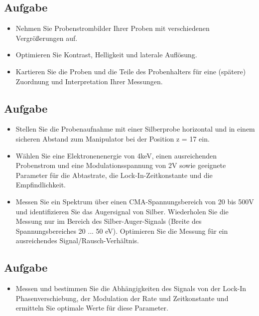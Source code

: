 \subsection{Aufgabe} %
\label{sub:aufgabe}
	
	\begin{itemize}
		 \item
		 	Nehmen Sie Probenstrombilder Ihrer Proben mit verschiedenen Vergrößerungen auf.
		 \item
		 	Optimieren Sie Kontrast, Helligkeit und laterale Auflösung.
		 \item
		 	Kartieren Sie die Proben und die Teile des Probenhalters für eine (spätere) Zuordnung und
		 	Interpretation Ihrer Messungen.
	\end{itemize}
	

\subsection{Aufgabe} %
\label{sub:aufgabe}

	\begin{itemize}
		\item
			Stellen Sie die Probenaufnahme mit einer Silberprobe horizontal und in einem sicheren Abstand zum Manipulator bei der Position z = 17 ein.
		\item
			Wählen Sie eine Elektronenenergie von 4keV, einen ausreichenden Probenstrom und eine Modulationsspannung von 2V sowie geeignete Parameter für die Abtastrate, die Lock-In-Zeitkonstante und die Empfindlichkeit.
		\item
			Messen Sie ein Spektrum über einen CMA-Spannungsbereich von 20 bis 500V und identifizieren Sie das Augersignal von Silber.
			Wiederholen Sie die Messung nur im Bereich des Silber-Auger-Signals (Breite des Spannungsbereiches 20 ... 50 eV).
			Optimieren Sie die Messung für ein ausreichendes Signal/Rausch-Verhältnis.
	\end{itemize}


\subsection{Aufgabe} %
\label{sub:aufgabe}
	
	\begin{itemize} 
		\item
			Messen und bestimmen Sie die Abhängigkeiten des Signals von der Lock-In Phasenverschiebung, der Modulation der Rate und Zeitkonstante und ermitteln Sie optimale Werte für diese Parameter.
	\end{itemize}


